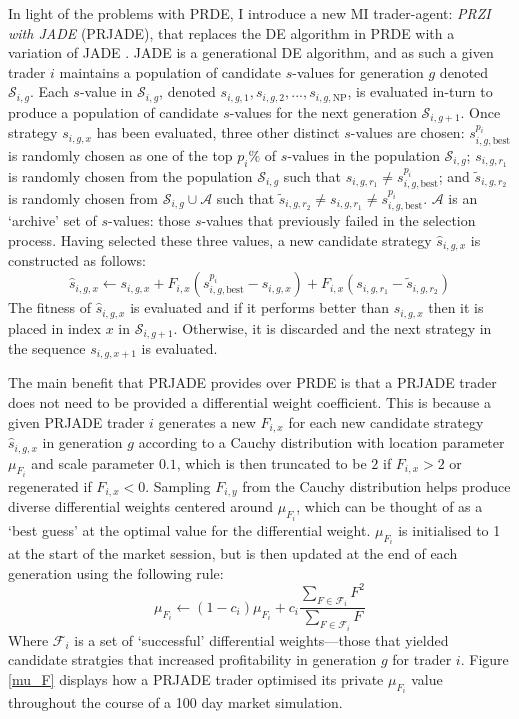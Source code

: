 \documentclass[conference]{IEEEtran}
\begin{document}
In light of the problems with PRDE, I introduce a new MI trader-agent: \textit{PRZI with JADE} (PRJADE), that replaces the DE algorithm in PRDE with a variation of JADE \cite{ZhangSanderson}.
JADE is a generational DE algorithm, and as such a given trader $i$ maintains a population of candidate $s$-values for generation $g$ denoted $\mathcal{S}_{i,g}$.
Each $s$-value in $\mathcal{S}_{i,g}$, denoted $s_{i,g,1}, s_{i,g,2}, ..., s_{i,g,\mathrm{NP}}$, is evaluated in-turn to produce a population of candidate $s$-values for the next generation $\mathcal{S}_{i,g+1}$.
Once strategy $s_{i,g,x}$ has been evaluated, three other distinct $s$-values are chosen: $s^{p_i}_{i,g,\text{best}}$ is randomly chosen as one of the top $p_i\%$ of $s$-values in the population $\mathcal{S}_{i,g}$; $s_{i,g,r_1}$ is randomly chosen from the population $\mathcal{S}_{i,g}$ such that $s_{i,g,r_1}\ne s^{p_i}_{i,g,\text{best}}$; and $\tilde{s}_{i,g,r_2}$ is randomly chosen from $\mathcal{S}_{i,g}\cup\mathcal{A}$ such that $\tilde{s}_{i,g,r_2}\ne s_{i,g,r_1}\ne s^{p_i}_{i,g,\text{best}}$.
$\mathcal{A}$ is an `archive' set of $s$-values: those $s$-values that previously failed in the selection process.
Having selected these three values, a new candidate strategy $\hat{s}_{i,g,x}$ is constructed as follows:
\[
    \hat{s}_{i,g,x}\leftarrow s_{i,g,x}+F_{i,x}\left(s^{p_i}_{i,g,\text{best}} - s_{i,g,x}\right) + F_{i,x}\left(s_{i,g,r_1} - \tilde{s}_{i,g,r_2}\right)
\]
The fitness of $\hat{s}_{i,g,x}$ is evaluated and if it performs better than $s_{i,g,x}$ then it is placed in index $x$ in $\mathcal{S}_{i,g+1}$. Otherwise, it is discarded and the next strategy in the sequence $s_{i,g,x+1}$ is evaluated.

The main benefit that PRJADE provides over PRDE is that a PRJADE trader does not need to be provided a differential weight coefficient.
This is because a given PRJADE trader $i$ generates a new $F_{i,x}$ for each new candidate strategy $\hat{s}_{i,g,x}$ in generation $g$ according to a Cauchy distribution with location parameter $\mu_{F_i}$ and scale parameter $0.1$, which is then truncated to be $2$ if $F_{i,x}>2$ or regenerated if $F_{i,x}<0$.
Sampling $F_{i,y}$ from the Cauchy distribution helps produce diverse differential weights centered around $\mu_{F_i}$, which can be thought of as a `best guess' at the optimal value for the differential weight.
$\mu_{F_i}$ is initialised to 1 at the start of the market session, but is then updated at the end of each generation using the following rule:
\[
    \mu_{F_i}\leftarrow (1-c_i)\mu_{F_i} + c_i\frac{\sum_{F\in \mathcal{F}_i} F^2}{\sum_{F\in\mathcal{F}_i} F}
\]
Where $\mathcal{F}_i$ is a set of `successful' differential weights---those that yielded candidate stratgies that increased profitability in generation $g$ for trader $i$.
Figure \ref{mu_F} displays how a PRJADE trader optimised its private $\mu_{F_i}$ value throughout the course of a 100 day market simulation.
\end{document}
